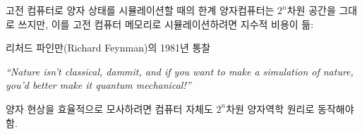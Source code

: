 \documentclass[aspectratio=169, 10pt]{beamer}
\begin{document}
\begin{frame}{고전 컴퓨터로 양자 상태를 시뮬레이션할 때의 한계}
    양자컴퓨터는 $2^n$차원 공간을 그대로 쓰지만, 이를 고전 컴퓨터 메모리로 시뮬레이션하려면 지수적 비용이 듦:
    \vspace{0.1cm}
    \begin{center}
    \end{center}
    \pause
    \vspace{0.15cm}
    \begin{qctip}{리처드 파인만(Richard Feynman)의 1981년 통찰}
        \begin{center}
            \textit{``Nature isn't classical, dammit, and if you want to make a simulation of nature,\\you'd better make it quantum mechanical!''}
        \end{center}
        양자 현상을 효율적으로 모사하려면 컴퓨터 자체도 $2^n$차원 양자역학 원리로 동작해야 함.
    \end{qctip}
\end{frame}
\end{document}
